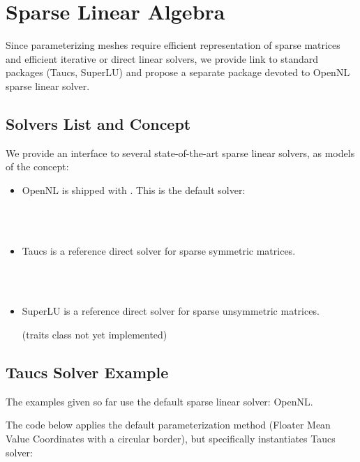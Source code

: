 \section{Sparse Linear Algebra}

Since parameterizing meshes require
efficient representation of sparse matrices and efficient iterative or
direct linear solvers, we provide link to standard packages ({\sc Taucs}, SuperLU)
and propose a separate package devoted to OpenNL sparse linear solver.

\subsection{Solvers List and Concept}

We provide an interface to several state-of-the-art
sparse linear solvers, as models of the  concept:

\begin{itemize}

\item OpenNL \cite{cgal:l-nmdgp-05} is shipped with \cgal. This is the default solver:

  \\
  \\

\item {\sc Taucs} is a reference direct solver for sparse symmetric matrices.

  \\
  \\

\item SuperLU is a reference direct solver for sparse unsymmetric matrices.

(traits class not yet implemented)

\end{itemize}


\subsection{{\sc Taucs} Solver Example}

The examples given so far use the default sparse linear solver: OpenNL.

The code below applies the default parameterization method
(Floater Mean Value Coordinates with a circular border),
but specifically instantiates {\sc Taucs} solver:

